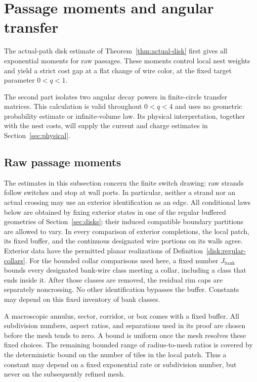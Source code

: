 \section{Passage moments and angular transfer}\label{sec:angular}

The actual-path disk estimate of Theorem~\ref{thm:actual-disk} first
gives all exponential moments for raw passages. These moments control
local nest weights and yield a strict cost gap at a flat change of wire
color, at the fixed target parameter $0<q<1$.

The second part isolates two angular decay powers in finite-circle
transfer matrices. This calculation is valid throughout $0<q<4$ and
uses no geometric probability estimate or infinite-volume law. Its
physical interpretation, together with the nest costs, will supply the
current and charge estimates in Section~\ref{sec:physical}.

\subsection{Raw passage moments}

The estimates in this subsection concern the finite switch drawing:
raw strands follow switches and stop at wall ports.  In particular,
neither a strand nor an actual crossing may use an exterior
identification as an edge.  All conditional laws below are obtained by
fixing exterior states in one of the regular buffered geometries of
Section~\ref{sec:disks}; their induced compatible boundary partitions
are allowed to vary.  In every comparison of exterior completions,
the local patch, its fixed buffer, and the continuous designated wire
portions on its walls agree.  Exterior data have the permitted planar
realizations of Definition~\ref{disk:regular-collars}.  For the bounded
collar comparisons used here, a fixed number $J_{\mathrm{bank}}$ bounds
every designated bank-wire class meeting a collar, including a class that
ends inside it.
After those classes are removed, the residual rim caps are separately
noncrossing.  No other identification bypasses the buffer.  Constants may
depend on this fixed inventory of bank classes.

\begin{convention}
\label{angular:mesh-convention}
A macroscopic annulus, sector, corridor, or box comes with a fixed
buffer.  All subdivision numbers, aspect ratios, and separations used
in its proof are chosen before the mesh tends to zero.  A bound is
uniform once the mesh resolves these fixed choices.  The remaining
bounded range of radius-to-mesh ratios is covered by the deterministic
bound on the number of tiles in the local patch.  Thus a constant may
depend on a fixed exponential rate or subdivision number, but never
on the subsequently refined mesh.
\end{convention}

